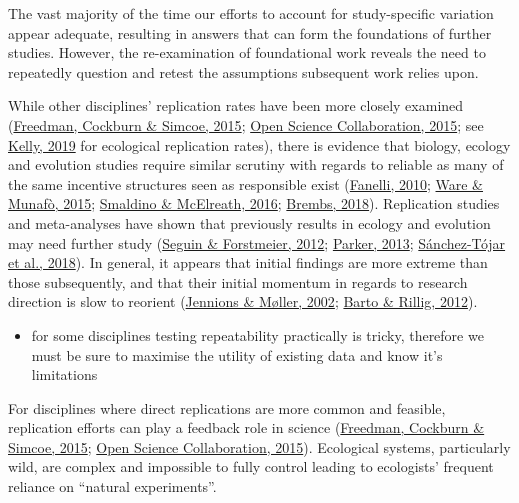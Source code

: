 \documentclass[10pt,a4paper]{article}
\providecommand{\tightlist}{%
  \setlength{\itemsep}{0pt}\setlength{\parskip}{0pt}}
\begin{document}
The vast majority of the time our efforts to account for study-specific variation appear adequate, resulting in answers that can form the foundations of further studies.
However, the re-examination of foundational work reveals the need to repeatedly question and retest the assumptions subsequent work relies upon.

While other disciplines' replication rates have been more closely examined (\protect\hyperlink{ref-freedman_economics_2015}{Freedman, Cockburn \& Simcoe, 2015}; \protect\hyperlink{ref-open_science_collaboration_estimating_2015}{Open Science Collaboration, 2015}; see \protect\hyperlink{ref-kelly_rate_2019}{Kelly, 2019} for ecological replication rates), there is evidence that biology, ecology and evolution studies require similar scrutiny with regards to reliable as many of the same incentive structures seen as responsible exist (\protect\hyperlink{ref-fanelli_pressures_2010}{Fanelli, 2010}; \protect\hyperlink{ref-ware_significance_2015}{Ware \& Munafò, 2015}; \protect\hyperlink{ref-smaldino_natural_2016}{Smaldino \& McElreath, 2016}; \protect\hyperlink{ref-Brembs2018}{Brembs, 2018}).
Replication studies and meta-analyses have shown that previously results in ecology and evolution may need further study (\protect\hyperlink{ref-seguin_no_2012}{Seguin \& Forstmeier, 2012}; \protect\hyperlink{ref-parker_what_2013}{Parker, 2013}; \protect\hyperlink{ref-sanchez-tojar_meta-analysis_2018}{Sánchez-Tójar et al., 2018}).
In general, it appears that initial findings are more extreme than those subsequently, and that their initial momentum in regards to research direction is slow to reorient (\protect\hyperlink{ref-jennions_relationships_2002}{Jennions \& Møller, 2002}; \protect\hyperlink{ref-barto_dissemination_2012}{Barto \& Rillig, 2012}).

\begin{itemize}
\tightlist
\item
  for some disciplines testing repeatability practically is tricky, therefore we must be sure to maximise the utility of existing data and know it's limitations
\end{itemize}

For disciplines where direct replications are more common and feasible, replication efforts can play a feedback role in science (\protect\hyperlink{ref-freedman_economics_2015}{Freedman, Cockburn \& Simcoe, 2015}; \protect\hyperlink{ref-open_science_collaboration_estimating_2015}{Open Science Collaboration, 2015}).
Ecological systems, particularly wild, are complex and impossible to fully control leading to ecologists' frequent reliance on ``natural experiments''.
\end{document}
